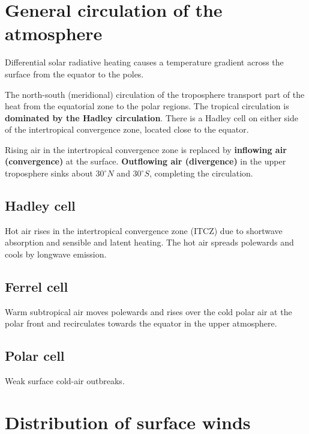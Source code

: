 \documentclass[11pt]{article}
\begin{document}
\section{General circulation of the atmosphere}
\label{sec:org84f789b}
Differential solar radiative heating causes a temperature gradient across the surface from the equator to the poles.


The north-south (meridional) circulation of the troposphere transport part of the heat from the equatorial zone to the polar regions. The tropical circulation is \textbf{dominated by the Hadley circulation}. There is a Hadley cell on either side of the intertropical convergence zone, located close to the equator.


Rising air in the intertropical convergence zone is replaced by \textbf{inflowing air (convergence)} at the surface. \textbf{Outflowing air (divergence)} in the upper troposphere sinks about \(30^{\circ} N\) and \(30^{\circ} S\), completing the circulation.
\subsection{Hadley cell}
\label{sec:org1232a48}
Hot air rises in the intertropical convergence zone (ITCZ) due to shortwave absorption and sensible and latent heating. The hot air spreads polewards and cools by longwave emission.
\subsection{Ferrel cell}
\label{sec:org1b5f55d}
Warm subtropical air moves polewards and rises over the cold polar air at the polar front and recirculates towards the equator in the upper atmosphere.
\subsection{Polar cell}
\label{sec:orgd46ca63}
Weak surface cold-air outbreaks.
\section{Distribution of surface winds}
\label{sec:org3ffd94a}
\end{document}

